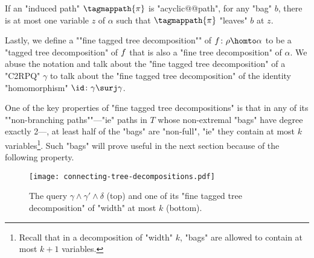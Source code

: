 \begin{fact}
	\AP\label{fact:acyclic-decomposition-leave-forever}
	If an "induced path" $\tagmappath{\pi}$ is "acyclic@@path", for any "bag" $b$,
	there is at most one variable $z$ of $\alpha$ such that $\tagmappath{\pi}$
	"leaves" $b$ at $z$.
\end{fact}

\AP Lastly, we define a ""fine tagged tree decomposition"" of $\fun\colon \rho \homto \alpha$
to be a "tagged tree decomposition" of $f$ that is also a "fine tree decomposition" of $\alpha$.
We abuse the notation and talk about the "fine tagged tree decomposition" of a "C2RPQ" $\gamma$
to talk about the "fine tagged tree decomposition" of the identity "homomorphism"
$\id\colon \gamma \surj \gamma$.

\AP One of the key properties of "fine tagged tree decompositions" is that in any of its ""non-branching paths""---"ie" paths in $T$ whose non-extremal "bags" have degree exactly 2---, at least half of the "bags" are "non-full", "ie" they
contain at most $k$ variables\footnote{Recall 
that in a decomposition of "width" $k$, "bags" are allowed to contain at most $k+1$ variables.}.
Such "bags" will prove useful in the next section because of the following property.

\begin{figure*}
    \centering
    \texttt{[image: connecting-tree-decompositions.pdf]}
    \caption{%
        \AP\label{fig:connecting-tree-decompositions} The query
        $\gamma \land \gamma' \land \delta$ (top)
        and one of its "fine tagged tree decomposition"
		of "width" at most $k$ (bottom).
    }
\end{figure*}

